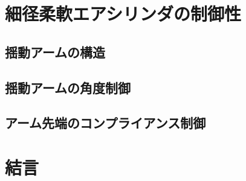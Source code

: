 \section{細径柔軟エアシリンダの制御性}%
\subsection{揺動アームの構造}
\subsection{揺動アームの角度制御}
\subsection{アーム先端のコンプライアンス制御}

\section{結言}%


